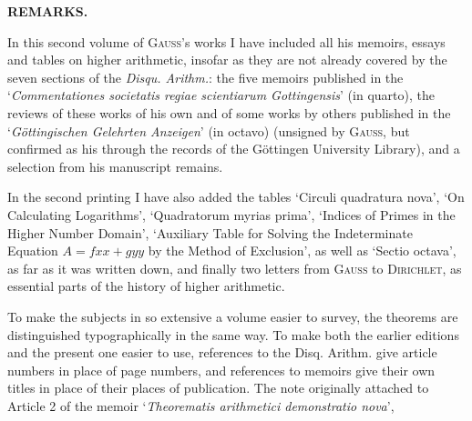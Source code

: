 \clearpage{}\renewcommand{\BookRunningTitle}{Remarks.}
\begin{center}\textbf{REMARKS.}\end{center}
In this second volume of \textsc{Gauss}’s works I have included all his memoirs, essays and tables on higher arithmetic, insofar as they are not already covered by the seven sections of the \textit{Disqu. Arithm.}: the five memoirs published in the ‘\textit{Commentationes societatis regiae scientiarum Gottingensis}’ (in quarto), the reviews of these works of his own and of some works by others published in the ‘\textit{Göttingischen Gelehrten Anzeigen}’ (in octavo) (unsigned by \textsc{Gauss}, but confirmed as his through the records of the Göttingen University Library), and a selection from his manuscript remains.
\par In the second printing I have also added the tables ‘Circuli quadratura nova’, ‘On Calculating Logarithms’, ‘Quadratorum myrias prima’, ‘Indices of Primes in the Higher Number Domain’, ‘Auxiliary Table for Solving the Indeterminate Equation $A=fxx+gyy$ by the Method of Exclusion’, as well as ‘Sectio octava’, as far as it was written down, and finally two letters from \textsc{Gauss} to \textsc{Dirichlet}, as essential parts of the history of higher arithmetic.
\par To make the subjects in so extensive a volume easier to survey, the theorems are distinguished typographically in the same way. To make both the earlier editions and the present one easier to use, references to the Disq. Arithm. give article numbers in place of page numbers, and references to memoirs give their own titles in place of their places of publication. The note originally attached to Article 2 of the memoir ‘\textit{Theorematis arithmetici demonstratio nova}’,
